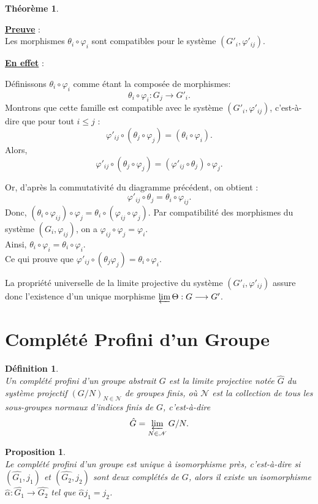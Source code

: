 \documentclass[a4paper, 14pt]{report}
\newtheorem{definition}{Définition}[section]
\newtheorem{proposition}{Proposition}[section]
\newtheorem{theorem}{Théorème}[section]
\begin{document}
\begin{onehalfspace}
{\begin{theorem}
	
\end{theorem}


\textbf{\underline{Preuve}} : \\
Les morphismes $\theta_i \circ \varphi_i$ sont compatibles pour le système $(G'_i, \varphi'_{ij})$.

\textbf{\underline{En effet}} :

Définissons $\theta_i \circ \varphi_i$ comme étant la composée de morphismes:
\[
\theta_i \circ \varphi_i : G_j \to G'_i.
\]
Montrons que cette famille est compatible avec le système $(G'_i, \varphi'_{ij})$, c'est-à-dire que pour tout $i \leq j$ :
\[
\varphi'_{ij} \circ (\theta_j \circ \varphi_j) = (\theta_i \circ \varphi_i).
\]	
Alors, 
\[
\varphi'_{ij} \circ (\theta_j \circ \varphi_j) = (\varphi'_{ij} \circ \theta_j) \circ \varphi_j.
\]

Or, d’après la commutativité du diagramme précédent, on obtient :
\[
\varphi'_{ij} \circ \theta_j = \theta_i \circ \varphi_{ij}.
\]
Donc, \((\theta_i \circ \varphi_{ij}) \circ \varphi_j = \theta_i \circ (\varphi_{ij} \circ \varphi_j).\)
Par compatibilité des morphismes du système $(G_i, \varphi_{ij})$, on a
\(\varphi_{ij} \circ \varphi_j = \varphi_i.\) \\
Ainsi,
\(
\theta_i \circ \varphi_i = \theta_i \circ \varphi_i.
\) \\
Ce qui prouve que 
\(
\varphi'_{ij} \circ (\theta_j \varphi_j) = \theta_i \circ \varphi_i.
\)

La propriété universelle de la limite projective du système $(G'_i, \varphi'_{ij})$ assure donc l'existence d'un unique morphisme $\varprojlim \Theta : G \longrightarrow G'$.


\section{Complété Profini d'un Groupe }

\begin{definition} \cite{herfort2012profinite}\\
Un complété profini d’un groupe abstrait \( G \) est la limite projective notée $\widehat{G}$ du système projectif \( (G/N)_{N \in \mathscr{N}} \) de groupes finis, où \( \mathscr{N} \) est la collection de tous les sous-groupes normaux d’indices finis de \( G \), c’est-à-dire
	\[
	\hat{G} = \varprojlim_{N \in \mathscr{N}} G/N.
	\]
\end{definition}

\begin{proposition} \cite{herfort2012profinite}\\
Le complété profini d’un groupe est unique à isomorphisme près, c’est-à-dire si $(\widehat{G_1}, j_1)$ et $(\widehat{G_2}, j_2)$ sont deux complétés de $G$, alors il existe un isomorphisme $\widehat{\alpha} : \widehat{G_1} \to \widehat{G_2}$ tel que $\widehat{\alpha} j_1 = j_2$.
\end{proposition}

}
\end{onehalfspace}
\end{document}
